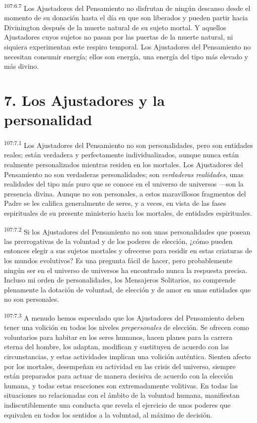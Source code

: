 \documentclass[twoside, 11pt]{book}
\begin{document}
\par
\textsuperscript{107:6.7} Los Ajustadores del Pensamiento no disfrutan de ningún descanso desde el momento de su donación hasta el día en que son liberados y pueden partir hacia Divinington después de la muerte natural de su sujeto mortal. Y aquellos Ajustadores cuyos sujetos no pasan por las puertas de la muerte natural, ni siquiera experimentan este respiro temporal. Los Ajustadores del Pensamiento no necesitan consumir energía; ellos son energía, una energía del tipo más elevado y más divino.

\section*{7. Los Ajustadores y la personalidad}
\par
\textsuperscript{107:7.1} Los Ajustadores del Pensamiento no son personalidades, pero son entidades reales; están verdadera y perfectamente individualizados, aunque nunca están realmente personalizados mientras residen en los mortales. Los Ajustadores del Pensamiento no son verdaderas personalidades; son \textit{verdaderas realidades}, unas realidades del tipo más puro que se conoce en el universo de universos ---son la presencia divina. Aunque no son personales, a estos maravillosos fragmentos del Padre se les califica generalmente de seres, y a veces, en vista de las fases espirituales de su presente ministerio hacia los mortales, de entidades espirituales.

\par
\textsuperscript{107:7.2} Si los Ajustadores del Pensamiento no son unas personalidades que posean las prerrogativas de la voluntad y de los poderes de elección, ¿cómo pueden entonces elegir a sus sujetos mortales y ofrecerse para residir en estas criaturas de los mundos evolutivos? Es una pregunta fácil de hacer, pero probablemente ningún ser en el universo de universos ha encontrado nunca la respuesta precisa. Incluso mi orden de personalidades, los Mensajeros Solitarios, no comprende plenamente la dotación de voluntad, de elección y de amor en unas entidades que no son personales.

\par
\textsuperscript{107:7.3} A menudo hemos especulado que los Ajustadores del Pensamiento deben tener una volición en todos los niveles \textit{prepersonales} de elección. Se ofrecen como voluntarios para habitar en los seres humanos, hacen planes para la carrera eterna del hombre, los adaptan, modifican y sustituyen de acuerdo con las circunstancias, y estas actividades implican una volición auténtica. Sienten afecto por los mortales, desempeñan su actividad en las crisis del universo, siempre están preparados para actuar de manera decisiva de acuerdo con la elección humana, y todas estas reacciones son extremadamente volitivas. En todas las situaciones no relacionadas con el ámbito de la voluntad humana, manifiestan indiscutiblemente una conducta que revela el ejercicio de unos poderes que equivalen en todos los sentidos a la voluntad, al máximo de decisión.
\end{document}
